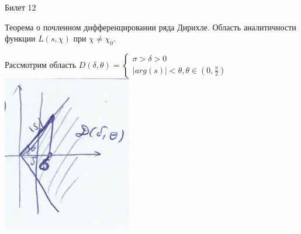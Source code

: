 \documentclass[a4paper,12pt]{article}
\newcommand{\TE}{\theta}
\newcommand{\q}{\quad}
\begin{document}
\newpage
\begin{mybox2}{\hypertarget{bil12}{Билет 12}}

\begin{formbox}{}
Теорема о почленном дифференцировании ряда Дирихле. Область аналитичности функции $L(s, \chi)$ при $\chi \not= \chi_0$.
\end{formbox}
Рассмотрим область $D(\delta, \TE) = \begin{cases} \sigma > \delta > 0\\|arg(s)| < \TE, \TE \in (0, \frac{\pi}{2})\end{cases}$\\
\includegraphics{p3.png}\q\\


\end{mybox2}
\end{document}
